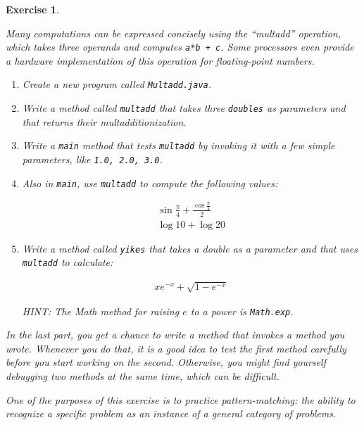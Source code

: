 \documentclass[12pt]{book}
\theoremstyle{exercise}
\newtheorem{exercise}{Exercise}[chapter]
\begin{document}
\begin{exercise}
\label{ex.multadd}

Many computations can be expressed concisely using the ``multadd'' operation, which takes three operands and computes {\tt a*b + c}.
Some processors even provide a hardware implementation of this operation for floating-point numbers.

\begin{enumerate}

\item Create a new program called {\tt Multadd.java}.

\item Write a method called {\tt multadd} that takes three {\tt doubles} as parameters and that returns their multadditionization.

\item Write a {\tt main} method that tests {\tt multadd} by invoking it with a few simple parameters, like {\tt 1.0, 2.0, 3.0}.

\item Also in {\tt main}, use {\tt multadd} to compute the following values:

\begin{eqnarray*}
& \sin \frac{\pi}{4} + \frac{\cos \frac{\pi}{4}}{2} & \\
& \log 10 + \log 20 &
\end{eqnarray*}

\item Write a method called {\tt yikes} that takes a double as a parameter and that uses {\tt multadd} to calculate:

\begin{eqnarray*}
x e^{-x} + \sqrt{1 - e^{-x}}
\end{eqnarray*}

HINT: The Math method for raising $e$ to a power is {\tt Math.exp}.

\end{enumerate}

In the last part, you get a chance to write a method that invokes a method you wrote.
Whenever you do that, it is a good idea to test the first method carefully before you start working on the second.
Otherwise, you might find yourself debugging two methods at the same time, which can be difficult.

One of the purposes of this exercise is to practice pattern-matching: the ability to recognize a specific problem as an instance of a general category of problems.
\end{exercise}
\end{document}
